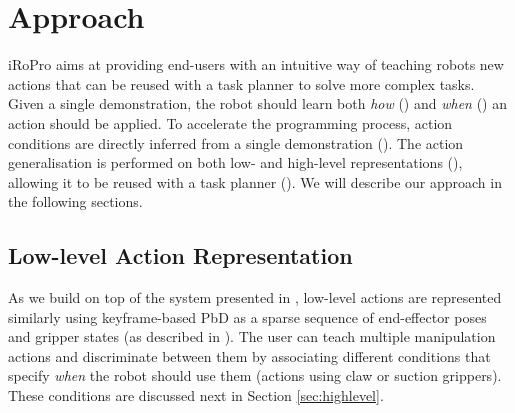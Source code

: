 \section{Approach}
\label{sec:approach}
iRoPro aims at providing end-users with an intuitive way of teaching robots new actions that can be reused with a task planner to solve more complex tasks.
Given a single demonstration, the robot should learn both \textit{how} () and \textit{when} () an action should be applied.
To accelerate the programming process, action conditions are directly inferred from a single demonstration ().
The action generalisation is performed on both low- and high-level representations (), allowing it to be reused with a task planner ().
We will describe our approach in the following sections.

\subsection{Low-level Action Representation}
\label{sec:lowlevel}
As we build on top of the system presented in , low-level actions are represented similarly using keyframe-based PbD as a sparse sequence of end-effector poses and gripper states (as described in ). 
%
The user can teach multiple manipulation actions and discriminate between them by associating different conditions that specify \textit{when} the robot should use them (\eg actions using claw or suction grippers).
These conditions are discussed next in Section \ref{sec:highlevel}.



